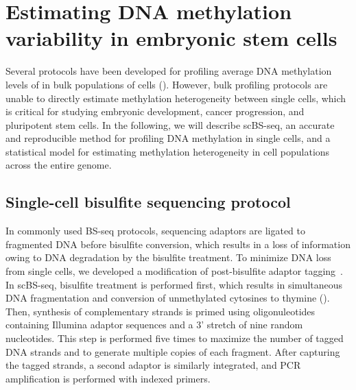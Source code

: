 \section{Estimating DNA methylation variability in embryonic stem cells} \label{sec:bs}

\ifpdf
    \graphicspath{{Chapter3/bs/Figs/Raster/}{Chapter3/bs/Figs/PDF/}{Chapter3/bs/Figs/}}
\else
    \graphicspath{{Chapter3/bs/Figs/Vector/}{Chapter3/bs/Figs/}}
\fi

Several protocols have been developed for profiling average DNA methylation levels of in bulk populations of cells (). However, bulk profiling protocols are unable to directly estimate methylation heterogeneity between single cells, which is critical for studying embryonic development, cancer progression, and pluripotent stem cells. In the following, we will describe scBS-seq, an accurate and reproducible method for profiling DNA methylation in single cells, and a statistical model for estimating methylation heterogeneity in cell populations across the entire genome.


\subsection{Single-cell bisulfite sequencing protocol} \label{sec:bs_proto}

In commonly used BS-seq protocols, sequencing adaptors are ligated to fragmented DNA before bisulfite conversion, which results in a loss of information owing to DNA degradation by the bisulfite treatment. To minimize DNA loss from single cells, we developed a modification of post-bisulfite adaptor tagging~\citep{miura_amplification-free_2012-1}. In scBS-seq, bisulfite treatment is performed first, which results in simultaneous DNA fragmentation and conversion of unmethylated cytosines to thymine (). Then, synthesis of complementary strands is primed using oligonuleotides containing Illumina adaptor sequences and a 3' stretch of nine random nucleotides. This step is performed five times to maximize the number of tagged DNA strands and to generate multiple copies of each fragment. After capturing the tagged strands, a second adaptor is similarly integrated, and PCR amplification is performed with indexed primers.

